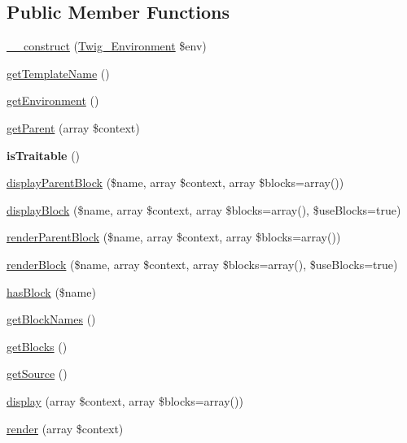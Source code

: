 \subsection*{Public Member Functions}
\begin{DoxyCompactItemize}
\item 
\hyperlink{classTwig__Template_a2afd7e3e1bf17af0e7033f4bf6eaaa1c}{\+\_\+\+\_\+construct} (\hyperlink{classTwig__Environment}{Twig\+\_\+\+Environment} \$env)
\item 
\hyperlink{classTwig__Template_a397b9d105e9940c4fd27c3a0d7b2b379}{get\+Template\+Name} ()
\item 
\hyperlink{classTwig__Template_aa0d25ffa6b97f4669db9ee17fb8c3986}{get\+Environment} ()
\item 
\hyperlink{classTwig__Template_a296cecdfa8222840edfcf0d8f93a9b21}{get\+Parent} (array \$context)
\item 
{\bfseries is\+Traitable} ()\hypertarget{classTwig__Template_a2bb0bccf6adcdcfe5b53875c05d56904}{}\label{classTwig__Template_a2bb0bccf6adcdcfe5b53875c05d56904}

\item 
\hyperlink{classTwig__Template_a6c31679b7461fc1dc2ef6b7f50c8ece6}{display\+Parent\+Block} (\$name, array \$context, array \$blocks=array())
\item 
\hyperlink{classTwig__Template_a9e5c6ee51d2af9988b939b9c3ce45ad1}{display\+Block} (\$name, array \$context, array \$blocks=array(), \$use\+Blocks=true)
\item 
\hyperlink{classTwig__Template_a20612c5b74e3dcaa89ee5aa9184ed9c8}{render\+Parent\+Block} (\$name, array \$context, array \$blocks=array())
\item 
\hyperlink{classTwig__Template_a9f0dffac404ca37c9a53becfac85ebce}{render\+Block} (\$name, array \$context, array \$blocks=array(), \$use\+Blocks=true)
\item 
\hyperlink{classTwig__Template_a664fcd85c68c9a1c699aae8e9eb63ed7}{has\+Block} (\$name)
\item 
\hyperlink{classTwig__Template_a0816e72e459f6702f72c505d4f9d0314}{get\+Block\+Names} ()
\item 
\hyperlink{classTwig__Template_a39519a59c44b817b825176eebb72d2d2}{get\+Blocks} ()
\item 
\hyperlink{classTwig__Template_aa6fccf98e42491d639261578142ace1e}{get\+Source} ()
\item 
\hyperlink{classTwig__Template_a779cec88bc123f80139578fcf16e8ae8}{display} (array \$context, array \$blocks=array())
\item 
\hyperlink{classTwig__Template_a0e58b66ecccd2229fa051524083a35be}{render} (array \$context)
\end{DoxyCompactItemize}
